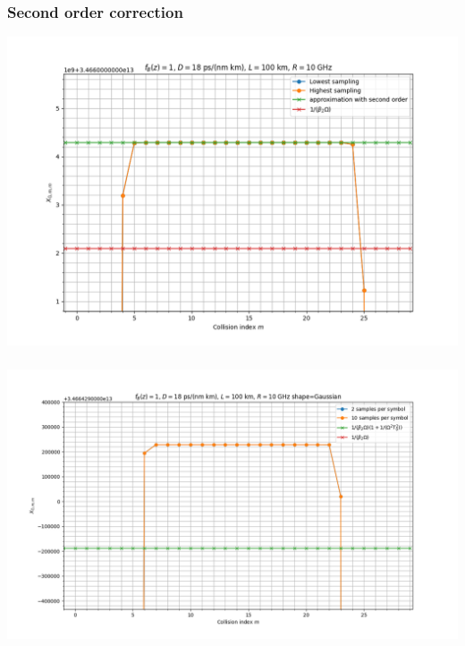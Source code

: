 \documentclass[8pt]{beamer} %
\begin{document}
\begin{frame}
	\frametitle{Second order correction}
	\includegraphics[width=\textwidth]{"./images/sim/second_order.png"}
\end{frame}

\begin{frame}
	\frametitle{}
	\includegraphics[width=\textwidth]{"./images/sim/second_error.png"}
\end{frame}
\end{document}
